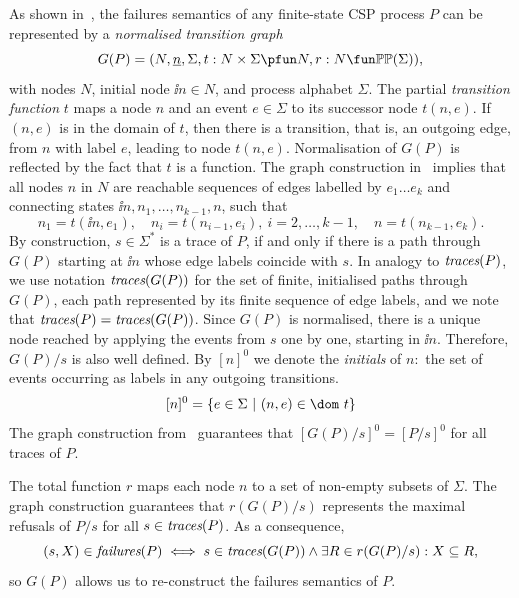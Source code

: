 As shown in~\cite{Roscoe:1994:CME:197600}, the failures semantics of 
any finite-state CSP process $P$
can be represented by a \emph{normalised transition graph}
$$
G(P) = ( N, \ii n, \Sigma, t : N\times\Sigma \pfun N, r : N \fun \mathbb{P}\mathbb{P}(\Sigma)),
$$
with nodes $N$, initial node $\ii n\in N$, and process alphabet $\Sigma$. The
partial \emph{transition function} $t$ maps a node $n$ and an event
$e\in\Sigma$ to its successor node $t(n,e)$. If $(n,e)$ is in the domain of
$t$, then there is a transition, that is, an outgoing edge, from $n$ with label $e$, leading to node $t(n,e)$. Normalisation of
$G(P)$ is reflected by the fact that $t$ is a function. The graph construction
in~\cite{Roscoe:1994:CME:197600} implies that all nodes $n$ in $N$ are reachable
sequences of edges labelled by $e_1\dots e_k$ and connecting states
$\ii n,n_1,\dots,n_{k-1},n$, such that
\[
n_1 = t(\ii n,e_1), \quad n_i = t(n_{i-1},e_i),\ i = 2,\dots,k-1,\quad
n= t(n_{k-1},e_k).
\]
%
By construction, $s\in\Sigma^*$ is a trace of $P$, if and only if 
there is a path through $G(P)$ starting  at $\ii n$ whose edge labels
coincide with $s$. In analogy to $\text{\it traces}(P)$, we use
notation $\text{\it traces}(G(P))$ for the set of finite, initialised paths
through $G(P)$, each path represented by its finite sequence of edge labels, and we
note that $\text{\it traces}(P) = \text{\it traces}(G(P))$. 
Since $G(P)$ is normalised, there is a unique node
reached by applying the events from $s$ one by one, starting in $\ii n$.
Therefore, $G(P)/s$  is also well defined. By $[n]^0$ we denote the
\emph{initials} of $n$:~the set of events occurring as labels in any outgoing
transitions.
$$
[n]^0 = \{ e\in\Sigma~|~(n,e)\in\dom~t \}
$$
The graph construction from~\cite{Roscoe:1994:CME:197600} guarantees that
$[G(P)/s]^0 = [P/s]^0$ for all traces of $P$.

 

The total function $r$ maps each node $n$ to a set of non-empty subsets of $\Sigma$. 
The graph construction guarantees that $r(G(P)/s)$ represents the maximal refusals
of $P/s$ for all 
$s\in\text{\it traces}(P)$. As a consequence,  
\begin{equation}\label{eq:refsAndR}
(s,X)\in\text{\it failures}(P) \iff s\in\text{\it traces}(G(P)) \wedge \exists R\in r(G(P)/s): X\subseteq R,
\end{equation}
so $G(P)$ allows us to re-construct the failures semantics of $P$.


 

%
%

